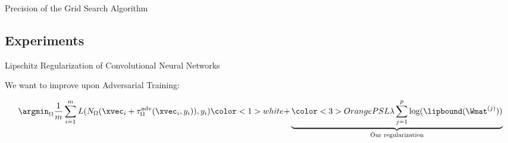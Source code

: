 \begin{frame}{Precision of the Grid Search Algorithm}
  \vspace{0.3cm}


\end{frame}



\subsection{Experiments}

\begin{frame}{Lipschitz Regularization of Convolutional Neural Networks}
 
  We want to improve upon Adversarial Training:

  \begin{equation}
    \argmin_{\Omega} \frac{1}{m} \sum_{i = 1}^{m} L (N_\Omega (\xvec_i + \tau_{\Omega}^{\mathrm{adv}}(\xvec_i, y_i)), y_i) \color<1>{white}{ + \underbrace{{\color<3>{OrangePSL}{\lambda}} \sum_{j=1}^p \log(\lipbound(\Wmat^{(j)}))}_{\text{Our regularization}}}
  \end{equation}


  \vspace{0.4cm}

\end{frame}



